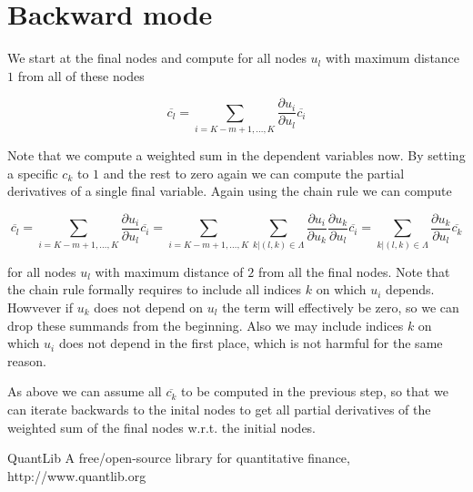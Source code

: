 \documentclass{amsart}
\theoremstyle{plain}
\numberwithin{equation}{section}
\begin{document}
\section{Backward mode}

We start at the final nodes and compute for all nodes $u_l$ with maximum distance $1$ from all of these nodes

\begin{equation}
\overline{c_l} = \sum_{i=K-m+1,\dots,K} \frac{\partial u_i}{\partial u_l} \overline{c_i}
\end{equation}

Note that we compute a weighted sum in the dependent variables now. By setting a specific $c_k$ to $1$ and the rest to zero again we can compute the partial derivatives of a single final variable. Again using the chain rule we can compute 

\begin{equation}
\overline{c_l} = \sum_{i=K-m+1,\dots,K} \frac{\partial u_i}{\partial u_l} \overline{c_i} = \sum_{i=K-m+1,\dots,K}\sum_{k|(l,k)\in\Lambda} \frac{\partial u_i}{\partial u_k}\frac{\partial u_k}{\partial u_l} \overline{c_i} = \sum_{k|(l,k)\in\Lambda} \frac{\partial u_k}{\partial u_l} \overline{c_k}
\end{equation}

for all nodes $u_l$ with maximum distance of $2$ from all the final nodes. Note that the chain rule formally requires to include all indices $k$ on which $u_i$ depends. Howvever if $u_k$ does not depend on $u_l$ the term will effectively be zero, so we can drop these summands from the beginning. Also we may include indices $k$ on which $u_i$ does not depend in the first place, which is not harmful for the same reason.

As above we can assume all $\overline{c_k}$ to be computed in the previous step, so that we can iterate backwards to the inital nodes to get all partial derivatives of the weighted sum of the final nodes w.r.t. the initial nodes.



\begin{thebibliography}{2}

QuantLib A free/open-source library for quantitative finance, http://www.quantlib.org

\end{thebibliography}
\end{document}
